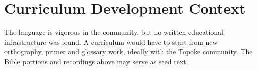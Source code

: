 \documentclass[12pt]{article}
\begin{document}
\section{Curriculum Development Context}
The language is vigorous in the community, but no written educational infrastructure was found. A curriculum would have to start from new orthography, primer and glossary work, ideally with the Topoke community. The Bible portions and recordings above may serve as seed text.
\end{document}
